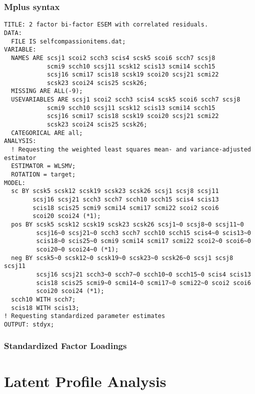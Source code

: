 \documentclass[aps,floatfix,prl]{revtex4}
\begin{document}
\hypertarget{mplus-syntax-2}{%
\subsubsection{Mplus syntax}\label{mplus-syntax-2}}

\begin{verbatim}
TITLE: 2 factor bi-factor ESEM with correlated residuals.
DATA:
  FILE IS selfcompassionitems.dat;
VARIABLE:
  NAMES ARE scsj1 scoi2 scch3 scis4 scsk5 scoi6 scch7 scsj8 
            scmi9 scch10 scsj11 scsk12 scis13 scmi14 scch15 
            scsj16 scmi17 scis18 scsk19 scoi20 scsj21 scmi22 
            scsk23 scoi24 scis25 scsk26; 
  MISSING ARE ALL(-9);
  USEVARIABLES ARE scsj1 scoi2 scch3 scis4 scsk5 scoi6 scch7 scsj8 
            scmi9 scch10 scsj11 scsk12 scis13 scmi14 scch15 
            scsj16 scmi17 scis18 scsk19 scoi20 scsj21 scmi22 
            scsk23 scoi24 scis25 scsk26; 
  CATEGORICAL ARE all;
ANALYSIS:
  ! Requesting the weighted least squares mean- and variance-adjusted estimator
  ESTIMATOR = WLSMV;
  ROTATION = target;
MODEL:
  sc BY scsk5 scsk12 scsk19 scsk23 scsk26 scsj1 scsj8 scsj11 
        scsj16 scsj21 scch3 scch7 scch10 scch15 scis4 scis13 
        scis18 scis25 scmi9 scmi14 scmi17 scmi22 scoi2 scoi6 
        scoi20 scoi24 (*1);
  pos BY scsk5 scsk12 scsk19 scsk23 scsk26 scsj1~0 scsj8~0 scsj11~0 
         scsj16~0 scsj21~0 scch3 scch7 scch10 scch15 scis4~0 scis13~0 
         scis18~0 scis25~0 scmi9 scmi14 scmi17 scmi22 scoi2~0 scoi6~0 
         scoi20~0 scoi24~0 (*1);
  neg BY scsk5~0 scsk12~0 scsk19~0 scsk23~0 scsk26~0 scsj1 scsj8 scsj11 
         scsj16 scsj21 scch3~0 scch7~0 scch10~0 scch15~0 scis4 scis13 
         scis18 scis25 scmi9~0 scmi14~0 scmi17~0 scmi22~0 scoi2 scoi6 
         scoi20 scoi24 (*1);
  scch10 WITH scch7;
  scis18 WITH scis13;
! Requesting standardized parameter estimates
OUTPUT: stdyx;
\end{verbatim}

\newpage

\hypertarget{standardized-factor-loadings-3}{%
\subsubsection{Standardized Factor
Loadings}\label{standardized-factor-loadings-3}}



\newpage

\hypertarget{latent-profile-analysis}{%
\section{Latent Profile Analysis}\label{latent-profile-analysis}}
\end{document}
